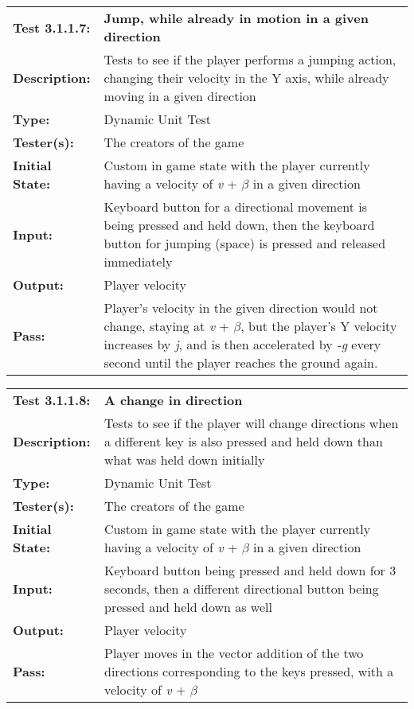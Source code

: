 \documentclass[12pt, titlepage]{article}
\begin{document}
\begin{enumerate}
\begin{mdframed}[linewidth=1pt]
\begin{tabularx}{\textwidth}{@{}p{3cm}X@{}}
{\bf Test 3.1.1.7:} & {\bf Jump, while already in motion in a given direction}\\[\baselineskip]
{\bf Description:} & Tests to see if the player performs a jumping action, changing their velocity in the Y axis, while already moving in a given direction\\[0.5\baselineskip]
{\bf Type:} & Dynamic Unit Test\\[0.5\baselineskip]
{\bf Tester(s):} & The creators of the game\\[0.5\baselineskip]
{\bf Initial State:} & Custom in game state with the player currently having a velocity of \textit{v} + $\beta$ in a given direction \\[0.5\baselineskip]
{\bf Input:} & Keyboard button for a directional movement is being pressed and held down, then the keyboard button for jumping (space) is pressed and released immediately\\[0.5\baselineskip]
{\bf Output:} & Player velocity\\[0.5\baselineskip]
{\bf Pass:} & Player's velocity in the given direction would not change, staying at \textit{v} + $\beta$, but the player's Y velocity increases by \textit{j}, and is then accelerated by \textit{-g} every second until the player reaches the ground again. 
\end{tabularx}
\end{mdframed}

\begin{mdframed}[linewidth=1pt]
\begin{tabularx}{\textwidth}{@{}p{3cm}X@{}}
{\bf Test 3.1.1.8:} & {\bf A change in direction}\\[\baselineskip]
{\bf Description:} & Tests to see if the player will change directions when a different key is also pressed and held down than what was held down initially\\[0.5\baselineskip]
{\bf Type:} & Dynamic Unit Test\\[0.5\baselineskip]
{\bf Tester(s):} & The creators of the game\\[0.5\baselineskip]
{\bf Initial State:} & Custom in game state with the player currently having a velocity of \textit{v} + $\beta$ in a given direction\\[0.5\baselineskip]
{\bf Input:} & Keyboard button being pressed and held down for 3 seconds, then a different directional button being pressed and held down as well \\[0.5\baselineskip]
{\bf Output:} & Player velocity\\[0.5\baselineskip]
{\bf Pass:} & Player moves in the vector addition of the two directions corresponding to the keys pressed, with a velocity of \textit{v} + $\beta$
\end{tabularx}
\end{mdframed}


\end{enumerate}
\end{document}
